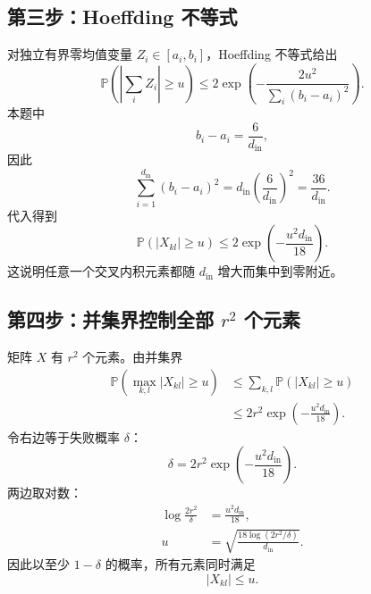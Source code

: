 \documentclass[UTF8,12pt,a4paper,fontset=none]{ctexart}
\numberwithin{equation}{section}
\newcommand{\Prob}{\mathbb{P}}
\begin{document}
\subsection{第三步：Hoeffding 不等式}

对独立有界零均值变量 $Z_i\in[a_i,b_i]$，Hoeffding 不等式给出
\begin{equation}
  \Prob\left(\left|\sum_i Z_i\right|\ge u\right)
  \le 2\exp\left(
  -\frac{2u^2}{\sum_i(b_i-a_i)^2}
  \right).
\end{equation}
本题中
\begin{equation}
  b_i-a_i=\frac{6}{d_{\mathrm{in}}},
\end{equation}
因此
\begin{equation}
  \sum_{i=1}^{d_{\mathrm{in}}}(b_i-a_i)^2
  =d_{\mathrm{in}}
  \left(\frac{6}{d_{\mathrm{in}}}\right)^2
  =\frac{36}{d_{\mathrm{in}}}.
\end{equation}
代入得到
\begin{equation}
  \Prob(|X_{kl}|\ge u)
  \le 2\exp\left(-\frac{u^2d_{\mathrm{in}}}{18}\right).
  \tag{10}
  \label{eq:paper10}
\end{equation}
这说明任意一个交叉内积元素都随 $d_{\mathrm{in}}$ 增大而集中到零附近。

\subsection{第四步：并集界控制全部 \texorpdfstring{$r^2$}{r squared} 个元素}

矩阵 $X$ 有 $r^2$ 个元素。由并集界
\begin{align}
  \Prob\left(\max_{k,l}|X_{kl}|\ge u\right)
  &\le \sum_{k,l}\Prob(|X_{kl}|\ge u)\\
  &\le 2r^2\exp\left(-\frac{u^2d_{\mathrm{in}}}{18}\right).
  \tag{11}
  \label{eq:paper11}
\end{align}
令右边等于失败概率 $\delta$：
\begin{equation}
  \delta
  =2r^2\exp\left(-\frac{u^2d_{\mathrm{in}}}{18}\right).
\end{equation}
两边取对数：
\begin{align}
  \log\frac{2r^2}{\delta}
  &=\frac{u^2d_{\mathrm{in}}}{18},\\
  u&=\sqrt{
  \frac{18\log(2r^2/\delta)}{d_{\mathrm{in}}}
  }.
  \tag{12}
  \label{eq:paper12}
\end{align}
因此以至少 $1-\delta$ 的概率，所有元素同时满足
\begin{equation}
  |X_{kl}|\le u.
\end{equation}
\end{document}
